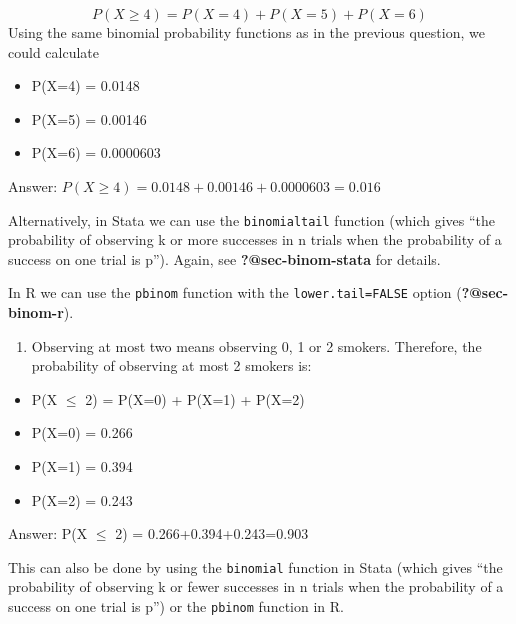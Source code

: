 \documentclass[
  a4paper,
]{memoir}
\providecommand{\tightlist}{%
  \setlength{\itemsep}{0pt}\setlength{\parskip}{0pt}}\usepackage{longtable,booktabs,array}
\begin{document}
\[ P(X \ge 4) = P(X=4) + P(X=5) + P(X=6) \] Using the same binomial
probability functions as in the previous question, we could calculate

\begin{itemize}
\tightlist
\item
  P(X=4) = 0.0148
\item
  P(X=5) = 0.00146
\item
  P(X=6) = 0.0000603
\end{itemize}

Answer: \(P(X \ge 4) = 0.0148 + 0.00146 + 0.0000603 = 0.016\)

Alternatively, in Stata we can use the \texttt{binomialtail} function
(which gives ``the probability of observing k or more successes in n
trials when the probability of a success on one trial is p''). Again,
see \textbf{?@sec-binom-stata} for details.

In R we can use the \texttt{pbinom} function with the
\texttt{lower.tail=FALSE} option (\textbf{?@sec-binom-r}).

\begin{enumerate}
\def\labelenumi{\alph{enumi})}
\setcounter{enumi}{2}
\tightlist
\item
  Observing at most two means observing 0, 1 or 2 smokers. Therefore,
  the probability of observing at most 2 smokers is:
\end{enumerate}

\begin{itemize}
\tightlist
\item
  P(X \(\le\) 2) = P(X=0) + P(X=1) + P(X=2)
\item
  P(X=0) = 0.266
\item
  P(X=1) = 0.394
\item
  P(X=2) = 0.243
\end{itemize}

Answer: P(X \(\le\) 2) = 0.266+0.394+0.243=0.903

This can also be done by using the \texttt{binomial} function in Stata
(which gives ``the probability of observing k or fewer successes in n
trials when the probability of a success on one trial is p'') or the
\texttt{pbinom} function in R.
\end{document}

